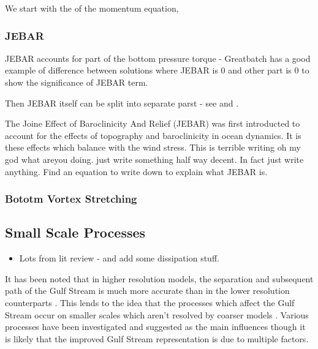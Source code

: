\documentclass[..\EOYR.tex]{subfiles}
\begin{document}
We start with the  of the momentum equation,
\begin{equation}\label{momentum}
\end{equation}

\subsubsection*{JEBAR}
\citep{Greatbatch1991} JEBAR accounts for part of the bottom pressure torque - Greatbatch has a good example of difference between solutions where JEBAR is 0 and other part is 0 to show the significance of JEBAR term.

Then JEBAR itself can be split into separate parst - see \citep{Greatbatch1991} and \citep{Gula2014}.\\



The Joine Effect of Baroclinicity And Relief (JEBAR) was first introducted to account for the effects of topography and baroclinicity in ocean dynamics. It is these effects which balance with the wind stress. This is terrible writing oh my god what areyou doing. just write something half way decent. In fact just write anything. Find an equation to write down to explain what JEBAR is.

\subsubsection*{Bototm Vortex Stretching}

\subsection{Small Scale Processes}
\begin{itemize}
    \item Lots from lit review - and add some dissipation stuff.
\end{itemize}


It has been noted that in higher resolution models, the separation and subsequent path of the Gulf Stream is much more accurate than in the lower resolution counterparts \citep{Hurlburt2008}\citep{Zhang2007}. This lends to the idea that the processes which affect the Gulf Stream occur on smaller scales which aren't resolved by coarser models \citep{NaveiraGarabato2013}\citep{Nikurashin2012a}. Various processes have been investigated and suggested as the main influences though it is likely that the improved Gulf Stream representation is due to multiple factors.
\end{document}
